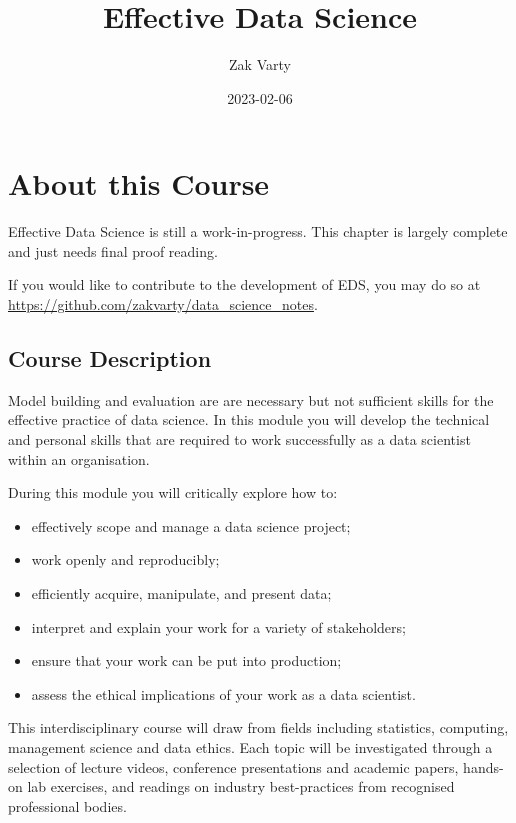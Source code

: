 \documentclass[
  12pt,
]{book}
\title{Effective Data Science}
\author{Zak Varty}
\date{2023-02-06}
\providecommand{\tightlist}{%
  \setlength{\itemsep}{0pt}\setlength{\parskip}{0pt}}
\begin{document}
\maketitle

{
\setcounter{tocdepth}{1}
\tableofcontents
}
\hypertarget{about-this-course}{%
\chapter*{About this Course}\label{about-this-course}}

Effective Data Science is still a work-in-progress. This chapter is largely complete and just needs final proof reading.

If you would like to contribute to the development of EDS, you may do so at \url{https://github.com/zakvarty/data_science_notes}.

\hypertarget{course-description}{%
\section*{Course Description}\label{course-description}}

Model building and evaluation are are necessary but not sufficient skills for the effective practice of data science. In this module you will develop the technical and personal skills that are required to work successfully as a data scientist within an organisation.

During this module you will critically explore how to:

\begin{itemize}
\tightlist
\item
  effectively scope and manage a data science project;
\item
  work openly and reproducibly;
\item
  efficiently acquire, manipulate, and present data;
\item
  interpret and explain your work for a variety of stakeholders;
\item
  ensure that your work can be put into production;
\item
  assess the ethical implications of your work as a data scientist.
\end{itemize}

This interdisciplinary course will draw from fields including statistics, computing, management science and data ethics. Each topic will be investigated through a selection of lecture videos, conference presentations and academic papers, hands-on lab exercises, and readings on industry best-practices from recognised professional bodies.
\end{document}
